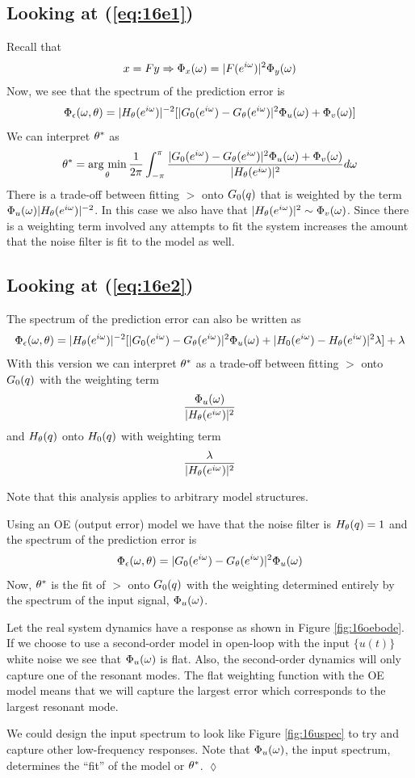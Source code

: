 \subsection{Looking at (\ref{eq:16e1})}
Recall that
$$x=Fy \Rightarrow \Phi_x(\omega)=|F(e^{i\omega})|^2\Phi_y(\omega)$$
Now, we see that the spectrum of the prediction error is
$$\Phi_\epsilon(\omega,\theta) = |H_\theta(e^{i\omega})|^{-2}[|G_0(e^{i\omega})-G_\theta(e^{i\omega})|^2\Phi_u(\omega) + \Phi_v(\omega)]$$
We can interpret $\theta^\ast$ as
$$\theta^\ast = \mathop{\arg\,\min}\limits_\theta \frac{1}{2\pi} \int_{-\pi}^\pi \frac{|G_0(e^{i\omega})-G_\theta(e^{i\omega})|^2\Phi_u(\omega)+\Phi_v(\omega)}{|H_\theta(e^{i\omega})|^2}d\omega$$
There is a trade-off between fitting $\gt$ onto $G_0(q)$ that is weighted by the term $\Phi_u(\omega)|H_\theta(e^{i\omega})|^{-2}$. In this case we also have that $|H_\theta(e^{i\omega})|^2\sim\Phi_v(\omega)$. Since there is a weighting term involved any attempts to fit the system increases the amount that the noise filter is fit to the model as well.

\subsection{Looking at (\ref{eq:16e2})}
The spectrum of the prediction error can also be written as
$$\Phi_\epsilon(\omega,\theta) = |H_\theta(e^{i\omega})|^{-2}[|G_0(e^{i\omega})-G_\theta(e^{i\omega})|^2\Phi_u(\omega)+|H_0(e^{i\omega})-H_\theta(e^{i\omega})|^2\lambda]+\lambda$$
With this version we can interpret $\theta^\ast$ as a trade-off between fitting $\gt$ onto $G_0(q)$ with the weighting term
$$\frac{\Phi_u(\omega)}{|H_\theta(e^{i\omega})|^2}$$
and $H_\theta(q)$ onto $H_0(q)$ with weighting term
$$\frac{\lambda}{|H_\theta(e^{i\omega})|^2}$$

Note that this analysis applies to arbitrary model structures.

\begin{example}
Using an OE (output error) model we have that the noise filter is $H_\theta(q)=1$ and the spectrum of the prediction error is
$$\Phi_\epsilon(\omega,\theta) = |G_0(e^{i\omega})-G_\theta(e^{i\omega})|^2\Phi_u(\omega)$$
Now, $\theta^\ast$ is the fit of $\gt$ onto $G_0(q)$ with the weighting determined entirely by the spectrum of the input signal, $\Phi_u(\omega)$.

Let the real system dynamics have a response as shown in Figure \ref{fig:16oebode}. If we choose to use a second-order model in open-loop with the input $\{u(t)\}$ white noise we see that $\Phi_u(\omega)$ is flat. Also, the second-order dynamics will only capture one of the resonant modes. The flat weighting function with the OE model means that we will capture the largest error which corresponds to the largest resonant mode.

We could design the input spectrum to look like Figure \ref{fig:16uspec} to try and capture other low-frequency responses. Note that $\Phi_u(\omega)$, the input spectrum, determines the ``fit'' of the model or $\theta^\ast$.
$\lozenge$
\end{example}

